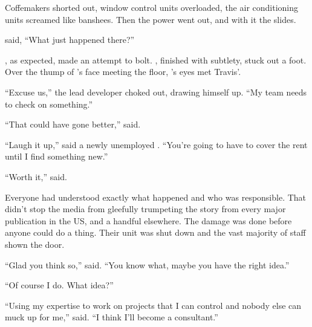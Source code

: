 Coffemakers shorted out, window control units overloaded, the air conditioning units screamed like banshees. Then the power went out, and with it the slides.

{\protag} said, ``What just happened there?''

\energyJerk{}, as expected, made an attempt to bolt. {\protag}, finished with subtlety, stuck out a foot. Over the thump of \energyJerk{}'s face meeting the floor, {\protag}'s eyes met Travis'.

``Excuse us,'' the lead developer choked out, drawing himself up. ``My team needs to check on something.''

\sectionBreak{}

``That could have gone better,'' {\sidetag} said.

``Laugh it up,'' said a newly unemployed {\protag}. ``You're going to have to cover the rent until I find something new.''

``Worth it,'' {\sidetag} said.

Everyone had understood exactly what happened and who was responsible. That didn't stop the media from gleefully trumpeting the story from every major publication in the US, and a handful elsewhere. The damage was done before anyone could do a thing. Their unit was shut down and the vast majority of staff shown the door.

``Glad you think so,'' {\protag} said. ``You know what, maybe you have the right idea.''

``Of course I do. What idea?''

``Using my expertise to work on projects that I can control and nobody else can muck up for me,'' {\protag} said. ``I think I'll become a consultant.''

